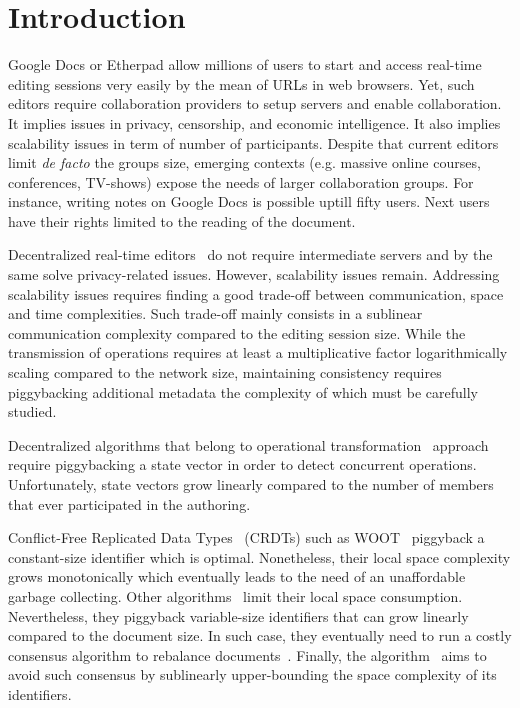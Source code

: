
\section{Introduction}

Google Docs or Etherpad allow millions of users to start and access real-time
editing sessions very easily by the mean of URLs in web browsers. Yet, such
editors require collaboration providers to setup servers and enable
collaboration. It implies issues in privacy, censorship, and economic
intelligence. It also implies scalability issues in term of number of
participants. Despite that current editors limit \emph{de facto} the groups
size, emerging contexts (e.g. massive online courses, conferences, TV-shows)
expose the needs of larger collaboration groups.  For instance, writing notes on
Google Docs is possible uptill fifty users. Next users have their rights limited
to the reading of the document.

Decentralized real-time editors~\cite{oster2006data, sun1998operational,
  sun2009contextbased} do not require intermediate servers and by the same solve
privacy-related issues. However, scalability issues remain.  Addressing
scalability issues requires finding a good trade-off between communication,
space and time complexities. Such trade-off mainly consists in a sublinear
communication complexity compared to the editing session size. While the
transmission of operations requires at least a multiplicative factor
logarithmically scaling compared to the network size, maintaining consistency
requires piggybacking additional metadata the complexity of which must be
carefully studied.

Decentralized algorithms that belong to operational
transformation~\cite{sun2009contextbased} approach require piggybacking a state
vector in order to detect concurrent operations. Unfortunately, state vectors
grow linearly compared to the number of members that ever participated in the
authoring.

Conflict-Free Replicated Data Types~\cite{shapiro2011comprehensive} (CRDTs) such
as WOOT~\cite{oster2006data} piggyback a constant-size identifier which is
optimal. Nonetheless, their local space complexity grows monotonically which
eventually leads to the need of an unaffordable garbage collecting. Other
algorithms~\cite{preguica2009commutative, weiss2010logootundo} limit their local
space consumption. Nevertheless, they piggyback variable-size identifiers that
can grow linearly compared to the document size. In such case, they eventually
need to run a costly consensus algorithm to rebalance
documents~\cite{zawirski2011asynchronous}. Finally, the \LSEQ
algorithm~\cite{nedelec2013concurrency} aims to avoid such consensus by
sublinearly upper-bounding the space complexity of its identifiers. 

